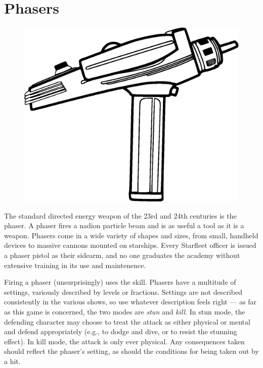 \documentclass[12pt,titlepage,openany]{book}
\begin{document}
\section{Phasers}\label{sec:phasers}
\begin{figure}
    \vspace{-3em}
    \centering
    \includegraphics[width=0.8\linewidth]{img/Phaser.eps}\\
\end{figure}

The standard directed energy weapon of the 23rd and 24th centuries is the
phaser. A phaser fires a nadion particle beam and is as useful a tool as it is
a weapon. Phasers come in a wide variety of shapes and sizes, from small,
handheld devices to massive cannons mounted on starships. Every Starfleet
officer is issued a phaser pistol as their sidearm, and no one graduates the
academy without extensive training in its use and maintenence.

Firing a phaser (unsurprisingly) uses the  skill. Phasers have a
multitude of settings, variously described by levels or fractions. Settings are
not described consistently in the various \StarTrek{} shows, so use whatever
description feels right --- as far as this game is concerned, the two modes are
\emph{stun} and \emph{kill}. In stun mode, the defending character may choose
to treat the attack as either physical or mental and defend appropriately
(e.g.,  to dodge and dive, or  to resist the
stunning effect). In kill mode, the attack is only ever physical. Any
consequences taken should reflect the phaser's setting, as should the
conditions for being taken out by a hit.
\end{document}
